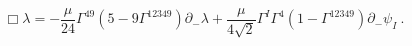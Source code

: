 \begin{equation}
\Box \lambda =
- \frac{\mu}{24} \Gamma^{49} ( 5 - 9 \Gamma^{12349} )
       \partial_- \lambda
+ \frac{\mu}{4 \sqrt{2}} \Gamma^I \Gamma^4
     ( 1 - \Gamma^{12349} ) \partial_- \psi_I ~.
\label{dil-eq}
\end{equation}

